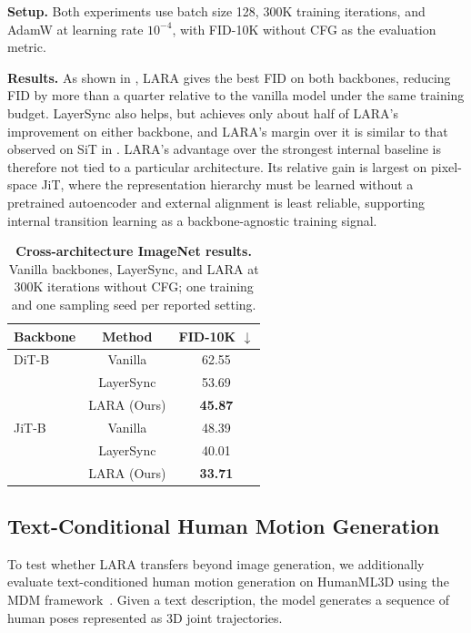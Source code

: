 \noindent\textbf{Setup.} Both experiments use batch size 128, 300K training iterations, and AdamW at learning rate $10^{-4}$, with FID-10K without CFG as the evaluation metric.

\noindent\textbf{Results.}
As shown in , LARA gives the best FID on both backbones, reducing FID by more than a quarter relative to the vanilla model under the same training budget. LayerSync also helps, but achieves only about half of LARA's improvement on either backbone, and LARA's margin over it is similar to that observed on SiT in . LARA's advantage over the strongest internal baseline is therefore not tied to a particular architecture. Its relative gain is largest on pixel-space JiT, where the representation hierarchy must be learned without a pretrained autoencoder and external alignment is least reliable, supporting internal transition learning as a backbone-agnostic training signal.





\begin{table}[!htbp]
\centering
\caption{\textbf{Cross-architecture ImageNet results.} Vanilla backbones, LayerSync, and LARA at 300K iterations without CFG; one training and one sampling seed per reported setting.}
\label{tab:cross_architecture}
\small
\begin{tabular}{@{}lcc@{}}
\toprule
Backbone & Method & FID-10K $\downarrow$ \\
\midrule
DiT-B & Vanilla & 62.55 \\
 & LayerSync &  53.69\\
 & LARA (Ours) & \textbf{45.87} \\
\midrule
JiT-B & Vanilla & 48.39 \\
 & LayerSync &  40.01\\
 & LARA (Ours) & \textbf{33.71} \\
\bottomrule
\end{tabular}
\end{table}

\subsection{Text-Conditional Human Motion Generation}
\label{sec:human_motion_generation}

To test whether LARA transfers beyond image generation, we additionally evaluate text-conditioned human motion generation on HumanML3D using the MDM framework~\citep{guo2022generating,tevet2022mdm}. Given a text description, the model generates a sequence of human poses represented as 3D joint trajectories.

